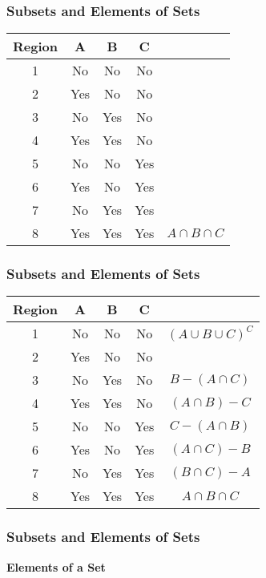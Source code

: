 \documentclass{beamer}
\begin{document}
\begin{frame}
\frametitle{Subsets and Elements of Sets}
\Large
\vspace{-1cm}
\begin{center}
\begin{tabular}{|c|c|c|c|c|}
\hline Region & A & B & C &  \\ 
\hline 1 &\phantom{sp} No \phantom{sp}&\phantom{sp} No\phantom{sp} & \phantom{sp} No \phantom{sp} &  \\ 
\hline 2 & Yes & No & No &  \\ 
\hline 3 & No & Yes & No &  \\ 
\hline 4 & Yes & Yes & No &  \\ 
\hline 5 & No & No & Yes &  \\ 
\hline 6 & Yes & No & Yes &  \\ 
\hline 7 & No & Yes & Yes &  \\ 
\hline 8 & Yes & Yes & Yes & $A \cap B \cap C$ \\ 
\hline 
\end{tabular}
\end{center} 
\end{frame}
\begin{frame}
\frametitle{Subsets and Elements of Sets}
\Large
\vspace{-1cm}
\begin{center}
\begin{tabular}{|c|c|c|c|c|}
\hline Region & A & B & C &  \\ 
\hline 1 &\phantom{s} No \phantom{s}&\phantom{s} No\phantom{s} & \phantom{s} No \phantom{s} & $(A \cup B \cup C)^C$  \\ 
\hline 2 & Yes & No & No &  \\ 
\hline 3 & No & Yes & No &  $B-(A \cap C)$\\ 
\hline 4 & Yes & Yes & No & $(A \cap B) - C$ \\ 
\hline 5 & No & No & Yes &  $C-(A \cap B)$ \\ 
\hline 6 & Yes & No & Yes & $(A \cap C) - B$ \\ 
\hline 7 & No & Yes & Yes & $(B \cap C) - A$ \\ 
\hline 8 & Yes & Yes & Yes & $A \cap B \cap C$ \\ 
\hline 
\end{tabular}
\end{center} 
\end{frame}
\begin{frame}
\frametitle{Subsets and Elements of Sets}
\Large
\vspace{-0.5cm}
\textbf{Elements of a Set}\\

\end{frame}
\end{document}
